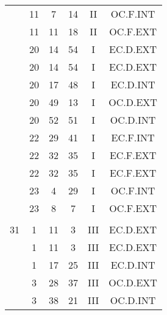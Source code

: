 \documentclass[12pt, a4paper]{article}
\begin{document}
\begin{multicols}{3}
{\begin{tabular}{c c c c c c}
	 	 	 	 & 11 & 7 & 14 & II & OC.F.INT\\%
	 	 	 	 & 11 & 11 & 18 & II & OC.F.EXT\\%
	 	 	 	 & 20 & 14 & 54 & I & EC.D.EXT\\%
	 	 	 	 & 20 & 14 & 54 & I & EC.D.EXT\\%
	 	 	 	 & 20 & 17 & 48 & I & EC.D.INT\\%
	 	 	 	 & 20 & 49 & 13 & I & OC.D.EXT\\%
	 	 	 	 & 20 & 52 & 51 & I & OC.D.INT\\%
	 	 	 	 & 22 & 29 & 41 & I & EC.F.INT\\%
	 	 	 	 & 22 & 32 & 35 & I & EC.F.EXT\\%
	 	 	 	 & 22 & 32 & 35 & I & EC.F.EXT\\%
	 	 	 	 & 23 & 4 & 29 & I & OC.F.INT\\%
	 	 	 	 & 23 & 8 & 7 & I & OC.F.EXT\\%
	 	 	 	 & & & & & \\%
	 	 	 	31 & 1 & 11 & 3 & III & EC.D.EXT\\%
	 	 	 	 & 1 & 11 & 3 & III & EC.D.EXT\\%
	 	 	 	 & 1 & 17 & 25 & III & EC.D.INT\\%
	 	 	 	 & 3 & 28 & 37 & III & OC.D.EXT\\%
	 	 	 	 & 3 & 38 & 21 & III & OC.D.INT\\%
	 	 \end{tabular}
 	}
\end{multicols}
\end{document}
